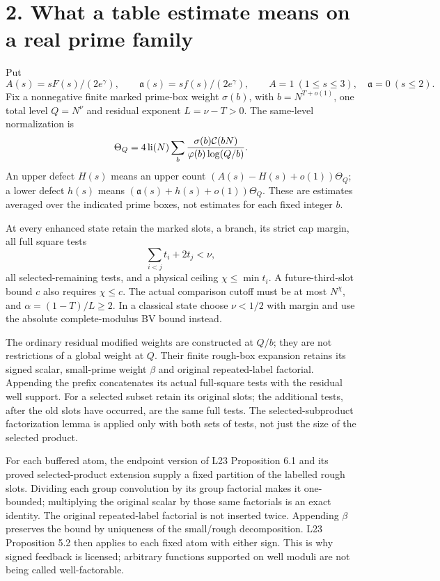 \documentclass[11pt]{article}
\newcommand{\aa}{\mathfrak a}
\begin{document}
\section*{2. What a table estimate means on a real prime family}
Put
\[
 A(s)=sF(s)/(2e^\gamma),\qquad \aa(s)=sf(s)/(2e^\gamma),\qquad
 A=1\ (1\le s\le3),\quad\aa=0\ (s\le2).
\]
Fix a nonnegative finite marked prime-box weight $\sigma(b)$, with
$b=N^{T+o(1)}$, one total level $Q=N^\nu$ and residual exponent
$L=\nu-T>0$. The same-level normalization is
\[
 \Theta_Q=4\operatorname{li}(N)
       \sum_b{\sigma(b)\mathcal C(bN)\over\varphi(b)\log(Q/b)}.
\]
An upper defect $H(s)$ means an upper count $(A(s)-H(s)+o(1))\Theta_Q$;
a lower defect $h(s)$ means $(\aa(s)+h(s)+o(1))\Theta_Q$.
These are estimates averaged over the indicated prime boxes, not
estimates for each fixed integer $b$.

At every enhanced state retain the marked slots, a branch, its strict
cap margin, all full square tests
\[
 \sum_{i<j}t_i+2t_j<\nu,
\]
all selected-remaining tests, and a physical ceiling $\chi\le\min t_i$.
A future-third-slot bound $c$ also requires $\chi\le c$. The actual
comparison cutoff must be at most $N^\chi$, and
$\alpha=(1-T)/L\ge2$. In a classical state choose $\nu<1/2$ with
margin and use the absolute complete-modulus BV bound instead.

The ordinary residual modified weights are constructed at $Q/b$;
they are not restrictions of a global weight at $Q$. Their finite
rough-box expansion retains its signed scalar, small-prime weight
$\beta$ and original repeated-label factorial. Appending the prefix
concatenates its actual full-square tests with the residual well
support. For a selected subset retain its original slots; the additional
tests, after the old slots have occurred, are the same full tests.
The selected-subproduct factorization lemma is applied only with both
sets of tests, not just the size of the selected product.

For each buffered atom, the endpoint version of L23 Proposition 6.1
and its proved selected-product extension supply a fixed partition of
the labelled rough slots. Dividing each group convolution by its
group factorial makes it one-bounded; multiplying the original scalar
by those same factorials is an exact identity. The original
repeated-label factorial is not inserted twice. Appending $\beta$
preserves the bound by uniqueness of the small/rough decomposition.
L23 Proposition 5.2 then applies to each fixed atom with either sign.
This is why signed feedback is licensed; arbitrary functions supported
on well moduli are not being called well-factorable.
\end{document}
